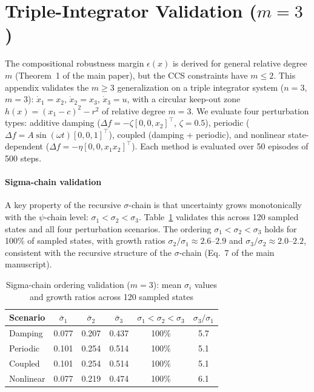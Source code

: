 \section{\texorpdfstring{Triple-Integrator Validation ($m=3$)}{Triple-Integrator Validation (m=3)}}
\label{sec:triple_integrator_appendix}

The compositional robustness margin $\epsilon(x)$ is derived for general relative degree $m$ (Theorem~1 of the main paper), but the CCS constraints have $m \leq 2$. This appendix validates the $m \geq 3$ generalization on a triple integrator system ($n = 3$, $m = 3$): $\dot{x}_1 = x_2$, $\dot{x}_2 = x_3$, $\dot{x}_3 = u$, with a circular keep-out zone $h(x) = (x_1 - c)^2 - r^2$ of relative degree $m = 3$. We evaluate four perturbation types: additive damping ($\Delta f = -\zeta [0, 0, x_2]^\top$, $\zeta = 0.5$), periodic ($\Delta f = A \sin(\omega t) [0, 0, 1]^\top$), coupled (damping + periodic), and nonlinear state-dependent ($\Delta f = -\eta [0, 0, x_1 x_2]^\top$). Each method is evaluated over 50 episodes of 500 steps.

\paragraph{Sigma-chain validation} A key property of the recursive $\sigma$-chain is that uncertainty grows monotonically with the $\psi$-chain level: $\sigma_1 < \sigma_2 < \sigma_3$. Table~\ref{tab:sigma_chain_m3} validates this across 120 sampled states and all four perturbation scenarios. The ordering $\sigma_1 < \sigma_2 < \sigma_3$ holds for 100\% of sampled states, with growth ratios $\sigma_2/\sigma_1 \approx 2.6$--$2.9$ and $\sigma_3/\sigma_2 \approx 2.0$--$2.2$, consistent with the recursive structure of the $\sigma$-chain (Eq.~7 of the main manuscript).

\begin{table}[htbp]
    \centering
    \caption{Sigma-chain ordering validation ($m = 3$): mean $\sigma_i$ values and growth ratios across 120 sampled states}
    \label{tab:sigma_chain_m3}
    \begin{tabular}{lccccc}
        \toprule
        Scenario & $\bar{\sigma}_1$ & $\bar{\sigma}_2$ & $\bar{\sigma}_3$ & $\sigma_1{<}\sigma_2{<}\sigma_3$ & $\sigma_3/\sigma_1$ \\
        \midrule
        Damping & 0.077 & 0.207 & 0.437 & 100\% & 5.7 \\
        Periodic & 0.101 & 0.254 & 0.514 & 100\% & 5.1 \\
        Coupled & 0.101 & 0.254 & 0.514 & 100\% & 5.1 \\
        Nonlinear & 0.077 & 0.219 & 0.474 & 100\% & 6.1 \\
        \bottomrule
    \end{tabular}
\end{table}

